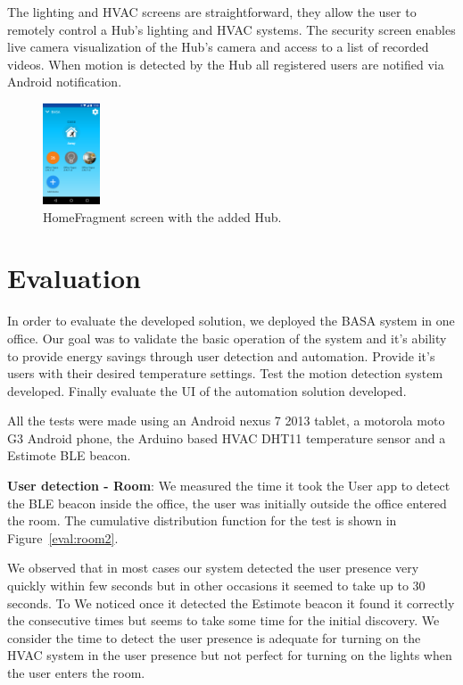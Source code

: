 \documentclass[conference]{IEEEtran}
\begin{document}
The lighting and \ac{HVAC} screens are straightforward, they allow the user to remotely control a Hub's lighting and \ac{HVAC} systems. The security screen enables live camera visualization of the Hub's camera and access to a list of recorded videos. When motion is detected by the Hub all registered users are notified via Android notification. 


\begin{figure}[h]
\centering
\includegraphics[width=0.15\textwidth]{Figures/imp_home_user_app}
\caption{HomeFragment screen with the added Hub.}
\label{imp_user_app}
\end{figure}


\section{Evaluation}

In order to evaluate the developed solution, we deployed the BASA system in one office. Our goal was to validate the basic operation  of the system and it's ability to provide energy savings through user detection and automation. Provide it's users with their desired temperature settings. Test the motion detection system developed. Finally evaluate the \ac{UI} of the automation solution developed.

All the tests were made using an Android nexus 7 2013 tablet, a motorola moto G3 Android phone, the Arduino based HVAC DHT11 temperature sensor and a Estimote BLE beacon.

\textbf{User detection - Room}: We measured the time it took the User app to detect the BLE beacon inside the office, the user was initially outside the office entered the room. The cumulative distribution function for the test is shown in Figure~\ref{eval:room2}.

We observed that in most cases our system detected the user presence very quickly within few seconds but in other occasions it seemed to take up to 30 seconds. To We noticed once it detected the Estimote beacon it found it correctly the consecutive times but seems to take some time for the initial discovery. We consider the time to detect the user presence is adequate for turning on the \ac{HVAC} system in the user presence but not perfect for turning on the lights when the user enters the room.
\end{document}
